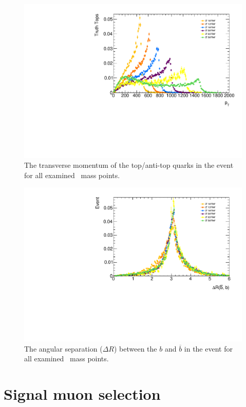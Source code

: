 \begin{figure}[t]
\includegraphics[width=\textwidth]{PartBoosted/Plots/h_trtop_pt.pdf}
\caption{The transverse momentum of the top/anti-top quarks in the event for all examined \Zprime\ mass points.} \label{fig:ExampleBoost}
\end{figure}

\begin{figure}[t]
\includegraphics[width=\textwidth]{PartBoosted/Plots/h_b_bbar_dr.pdf}
\caption{The angular separation ($\Delta R$) between the $b$ and $\overline{b}$ in the event for all examined \Zprime\ mass points.} \label{fig:ExampleBackToBack}
\end{figure}

\section{Signal muon selection}

